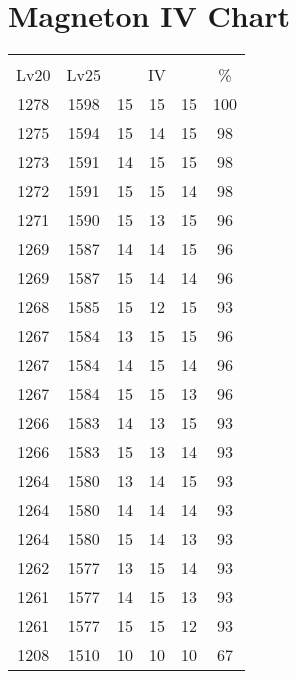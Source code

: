 \documentclass{article}%
\begin{document}
%
\normalsize%
\section{Magneton IV Chart}%
\label{sec:Magneton IV Chart}%
\renewcommand{\arraystretch}{1.5}%
\begin{tabular}{|c|c|c|c|c|c|}%
\hline%
\multicolumn{6}{|c|}{\textcolor{white}{ 
\linebreak{Magneton}
}%
\cellcolor{black}}\\%
\multicolumn{1}{|c}{Lv20}&\multicolumn{1}{c|}{Lv25}&\multicolumn{3}{c|}{IV}&\multicolumn{1}{|c|}{\%}\\%
\hline%
\rowcolor{color100}%
1278&1598&15&15&15&100\\%
\hline%
\rowcolor{color98}%
1275&1594&15&14&15&98\\%
\hline%
\rowcolor{color98}%
1273&1591&14&15&15&98\\%
\hline%
\rowcolor{color98}%
1272&1591&15&15&14&98\\%
\hline%
\rowcolor{color96}%
1271&1590&15&13&15&96\\%
\hline%
\rowcolor{color96}%
1269&1587&14&14&15&96\\%
\hline%
\rowcolor{color96}%
1269&1587&15&14&14&96\\%
\hline%
\rowcolor{color93}%
1268&1585&15&12&15&93\\%
\hline%
\rowcolor{color96}%
1267&1584&13&15&15&96\\%
\hline%
\rowcolor{color96}%
1267&1584&14&15&14&96\\%
\hline%
\rowcolor{color96}%
1267&1584&15&15&13&96\\%
\hline%
\rowcolor{color93}%
1266&1583&14&13&15&93\\%
\hline%
\rowcolor{color93}%
1266&1583&15&13&14&93\\%
\hline%
\rowcolor{color93}%
1264&1580&13&14&15&93\\%
\hline%
\rowcolor{color93}%
1264&1580&14&14&14&93\\%
\hline%
\rowcolor{color93}%
1264&1580&15&14&13&93\\%
\hline%
\rowcolor{color93}%
1262&1577&13&15&14&93\\%
\hline%
\rowcolor{color93}%
1261&1577&14&15&13&93\\%
\hline%
\rowcolor{color93}%
1261&1577&15&15&12&93\\%
\hline%
\rowcolor{color91}%
1208&1510&10&10&10&67\\%
\end{tabular}

%
\end{document}
